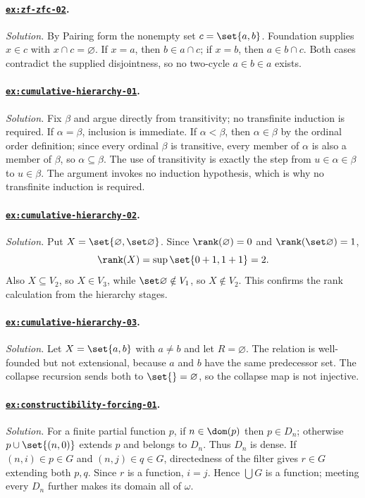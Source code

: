 \paragraph{\hyperref[ex:zf-zfc-02]{\texttt{ex:zf-zfc-02}}.}
\textit{Solution.}  By Pairing form the nonempty set \(c=\set{a,b}\).
Foundation supplies \(x\in c\) with \(x\cap c=\varnothing\).  If \(x=a\),
then \(b\in a\cap c\); if \(x=b\), then \(a\in b\cap c\).  Both cases
contradict the supplied disjointness, so no two-cycle \(a\in b\in a\) exists.

\paragraph{\hyperref[ex:cumulative-hierarchy-01]{\texttt{ex:cumulative-hierarchy-01}}.}
\textit{Solution.}  Fix \(\beta\) and argue directly from transitivity;
no transfinite induction is required.  If
\(\alpha=\beta\), inclusion is immediate.  If \(\alpha<\beta\), then
\(\alpha\in\beta\) by the ordinal order definition; since every ordinal
\(\beta\) is transitive, every member of \(\alpha\) is also a member of
\(\beta\), so \(\alpha\subseteq\beta\).  The use of transitivity is exactly the
step from \(u\in\alpha\in\beta\) to \(u\in\beta\).  The argument
invokes no induction hypothesis, which is why no transfinite induction is
required.

\paragraph{\hyperref[ex:cumulative-hierarchy-02]{\texttt{ex:cumulative-hierarchy-02}}.}
\textit{Solution.}  Put \(X=\set{\varnothing,\set\varnothing}\).  Since
\(\rank(\varnothing)=0\) and \(\rank(\set\varnothing)=1\),
\[
\rank(X)=\sup\set{0+1,1+1}=2.
\]
Also \(X\subseteq V_2\), so \(X\in V_3\), while
\(\set\varnothing\notin V_1\), so \(X\notin V_2\).  This confirms the rank
calculation from the hierarchy stages.

\paragraph{\hyperref[ex:cumulative-hierarchy-03]{\texttt{ex:cumulative-hierarchy-03}}.}
\textit{Solution.}  Let \(X=\set{a,b}\) with \(a\ne b\) and let
\(R=\varnothing\).  The relation is well-founded but not extensional, because
\(a\) and \(b\) have the same predecessor set.  The collapse recursion sends
both to \(\set{}=\varnothing\), so the collapse map is not injective.

\paragraph{\hyperref[ex:constructibility-forcing-01]{\texttt{ex:constructibility-forcing-01}}.}
\textit{Solution.}  For a finite partial function \(p\), if
\(n\in\dom(p)\) then \(p\in D_n\); otherwise
\(p\cup\set{(n,0)}\) extends \(p\) and belongs to \(D_n\).  Thus \(D_n\) is
dense.  If \((n,i)\in p\in G\) and \((n,j)\in q\in G\), directedness of the
filter gives \(r\in G\) extending both \(p,q\).  Since \(r\) is a function,
\(i=j\).  Hence \(\bigcup G\) is a function; meeting every \(D_n\) further
makes its domain all of \(\omega\).

